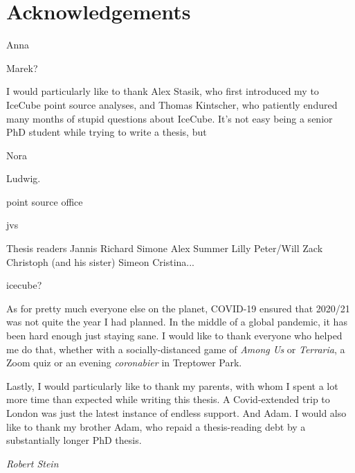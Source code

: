 \chapter*{Acknowledgements}

Anna

Marek?

I would particularly like to thank Alex Stasik, who first introduced my to IceCube point source analyses, and Thomas Kintscher, who patiently endured many months of stupid questions about IceCube. It's not easy being a senior PhD student while trying to write a thesis, but  

Nora 

Ludwig.

point source office 

jvs

Thesis readers Jannis Richard Simone Alex Summer Lilly Peter/Will Zack Christoph (and his sister) Simeon Cristina...

icecube?

As for pretty much everyone else on the planet, COVID-19 ensured that 2020/21 was not quite the year I had planned. In the middle of a global pandemic, it has been hard enough just staying sane. I would like to thank everyone who helped me do that, whether with a socially-distanced game of \emph{Among Us} or \emph{Terraria}, a Zoom quiz or an evening \emph{coronabier} in Treptower Park.

Lastly, I would particularly like to thank my parents, with whom I spent a lot more time than expected while writing this thesis. A Covid-extended trip to London was just the latest instance of endless support. And Adam. I would also like to thank my brother Adam, who repaid a thesis-reading debt by  a substantially longer PhD thesis. 

\begin{flushright}
	\textit{Robert Stein}
\end{flushright}
